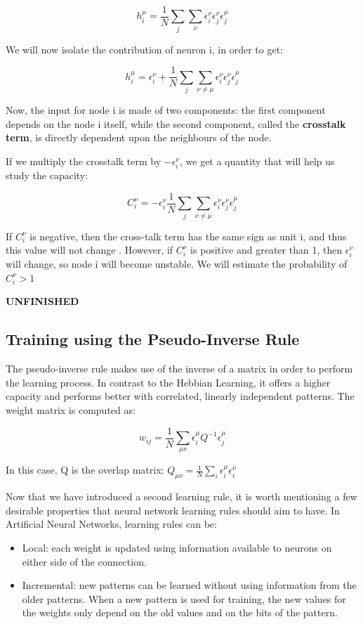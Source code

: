 \[ h_{i}^{\mu} = \frac{1}{N}\sum_{j} \sum_{\nu} \epsilon_{i}^{\nu}
						 \epsilon_{j}^{\nu}
						 \epsilon_{j}^{\mu}\]
 
 We will now isolate the contribution of neuron i, in order to get:
 
\[ h_{i}^{\mu} = \epsilon_{i}^{\nu} + \frac{1}{N}\sum_{j} \sum_{\nu\neq\mu} 			 					 \epsilon_{i}^{\nu}
						 \epsilon_{j}^{\nu}
						 \epsilon_{j}^{\mu}\]
 
 Now, the input for node i is made of two components: the first component depends on the node i itself, while the second component, called the \textbf{crosstalk term}, is directly dependent upon the neighbours of the node. 
 
 If we multiply the crosstalk term by \(-\epsilon_{i}^{\nu}\),  we get a quantity that will help us study the capacity:
 
 \[ C_{i}^{\nu}= -\epsilon_{i}^{\nu} \frac{1}{N}\sum_{j} \sum_{\nu\neq\mu} 			 			\epsilon_{i}^{\nu}
		       		 \epsilon_{j}^{\nu}
				 \epsilon_{j}^{\mu}\]
 
 If \( C_{i}^{\nu} \) is negative, then the cross-talk term has the same sign as unit i, and thus this value will not change \cite{lectureslides}. However, if \( C_{i}^{\nu} \) is positive and greater than 1, then \( \epsilon_{i}^{\nu}\) will change, so node i will become unstable. We will estimate the probability of \( C_{i}^{\nu} > 1 \)
 
 \textbf{UNFINISHED}
 
\subsection{Training using the Pseudo-Inverse Rule}

The pseudo-inverse rule makes use of the inverse of a matrix in order to perform the learning process. In contrast to the Hebbian Learning, it offers a higher capacity and performs better with correlated, linearly independent patterns. The weight matrix is computed as:

\[ w_{ij} = \frac{1}{N} \sum_{\mu\nu}\epsilon_{i}^\mu Q^{-1} \epsilon_{j}^\mu \]

In this case, Q is the overlap matrix:
\(  Q_{\mu\nu} = \frac{1}{N}\sum_{i}\epsilon_{i}^\mu \epsilon_{i}^\nu \)

Now that we have introduced a second learning rule, it is worth mentioning a few desirable properties that neural network learning rules should aim to have. In Artificial Neural Networks, learning rules can be:
\begin{itemize}
 \item Local: each weight is updated using information available to neurons on either side of the connection.
 \item Incremental: new patterns can be learned without using information from the older patterns. When a new pattern is used for training, the new values for the weights only depend on the old values and on the bits of the pattern.
\end{itemize}

